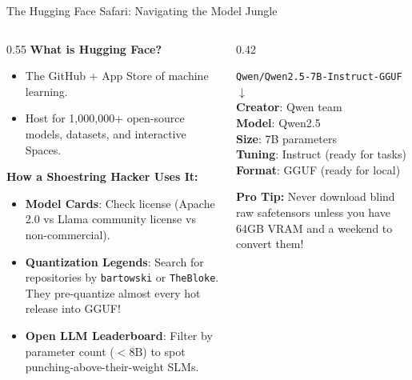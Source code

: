 \documentclass[10pt,aspectratio=169]{beamer}
\begin{document}
\begin{frame}{The Hugging Face Safari: Navigating the Model Jungle}
    \begin{columns}[T]
        \begin{column}{0.55\textwidth}
            \textbf{What is Hugging Face?}
            \begin{itemize}
                \item The GitHub + App Store of machine learning.
                \item Host for 1,000,000+ open-source models, datasets, and interactive Spaces.
            \end{itemize}
            \vspace{0.2cm}
            \textbf{How a Shoestring Hacker Uses It:}
            \begin{itemize}
                \item \textbf{Model Cards}: Check license (Apache 2.0 vs Llama community license vs non-commercial).
                \item \textbf{Quantization Legends}: Search for repositories by \texttt{bartowski} or \texttt{TheBloke}. They pre-quantize almost every hot release into GGUF!
                \item \textbf{Open LLM Leaderboard}: Filter by parameter count ($<8\text{B}$) to spot punching-above-their-weight SLMs.
            \end{itemize}
        \end{column}
        \begin{column}{0.42\textwidth}
            \begin{tcolorbox}[colback=ShoeGold!10, colframe=ShoeGold, title=\textbf{Search Anatomy}]
                \small
                \texttt{Qwen/Qwen2.5-7B-Instruct-GGUF}\\
                $\downarrow$\\
                \textbf{Creator}: Qwen team\\
                \textbf{Model}: Qwen2.5\\
                \textbf{Size}: 7B parameters\\
                \textbf{Tuning}: Instruct (ready for tasks)\\
                \textbf{Format}: GGUF (ready for local)
            \end{tcolorbox}
            \vspace{0.2cm}
            \alert{\textbf{Pro Tip:}} Never download blind raw safetensors unless you have 64GB VRAM and a weekend to convert them!
        \end{column}
    \end{columns}
\end{frame}
\end{document}
